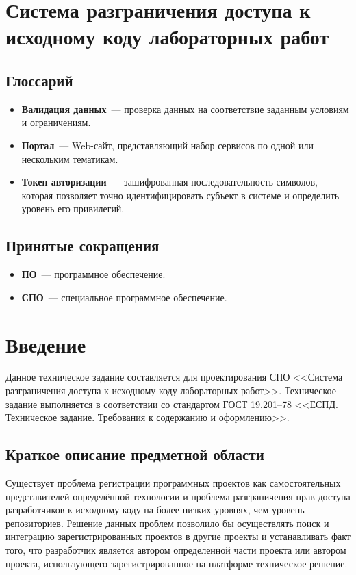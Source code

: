 \documentclass{bmstu}
\begin{document}
  \chapter*{Система разграничения доступа к исходному коду
  лабораторных работ}

  \section*{Глоссарий}

  \begin{itemize}
    \item[] \textbf{Валидация данных}~--- проверка данных на
      соответствие заданным условиям и ограничениям.
    \item[] \textbf{Портал}~--- Web-сайт, представляющий набор
      сервисов по одной или нескольким тематикам.
    \item[] \textbf{Токен авторизации}~--- зашифрованная
      последовательность символов, которая позволяет точно
      идентифицировать субъект в системе и определить уровень его
      привилегий.
  \end{itemize}

  \section*{Принятые сокращения}

  \begin{itemize}
    \item[] \textbf{ПО}~--- программное обеспечение.
    \item[] \textbf{СПО}~--- специальное программное обеспечение.
  \end{itemize}

  \chapter{Введение}

  Данное техническое задание составляется для проектирования СПО
  <<Система разграничения доступа к исходному коду лабораторных
  работ>>.
  Техническое задание выполняется в соответствии со стандартом ГОСТ
  19.201–78 <<ЕСПД. Техническое задание. Требования к содержанию и
  оформлению>>.

  \section{Краткое описание предметной области}

  Существует проблема регистрации программных проектов как
  самостоятельных представителей определённой технологии и проблема
  разграничения прав доступа разработчиков к исходному коду на более
  низких уровнях, чем уровень репозиториев.
  Решение данных проблем позволило бы осуществлять поиск и интеграцию
  зарегистрированных проектов в другие проекты и устанавливать факт
  того, что разработчик является автором определенной части проекта
  или автором проекта, использующего зарегистрированное на платформе
  техническое решение.
\end{document}
